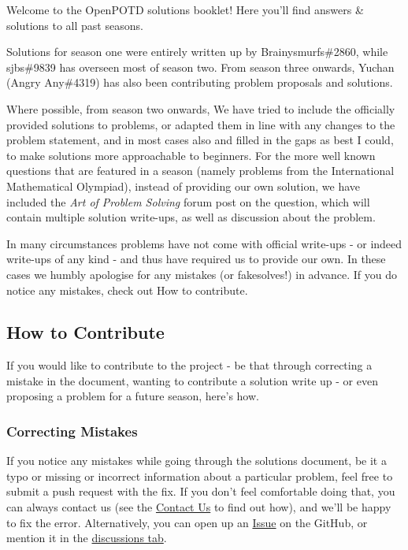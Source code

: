 Welcome to the OpenPOTD solutions booklet! Here you'll find answers \& solutions to all past seasons.\medskip

Solutions for season one were entirely written up by {\selectfont Brainysmurfs\#2860}, while {\selectfont sjbs\#9839} has overseen most of season two. 
From season three onwards, Yuchan ({\selectfont Angry Any\#4319}) has also been contributing problem proposals and solutions. 

Where possible, from season two onwards, We have tried to include the officially provided solutions to problems, 
or adapted them in line with any changes to the problem statement, and in most cases also and filled in the gaps as best I could, 
to make solutions more approachable to beginners. 
For the more well known questions that are featured in a season (namely problems from the International Mathematical Olympiad), 
instead of providing our own solution, we have included the \emph{Art of Problem Solving} forum post on the question, 
which will contain multiple solution write-ups, as well as discussion about the problem.

In many circumstances problems have not come with official write-ups - or indeed write-ups of any kind - 
and thus have required us to provide our own. In these cases we humbly apologise for any mistakes (or fakesolves!) in advance. 
If you do notice any mistakes, check out How to contribute.\medskip

\subsection*{How to Contribute}
\label{sec:contribute}

If you would like to contribute to the project - be that through correcting a mistake in the document, 
wanting to contribute a solution write up - or even proposing a problem for a future season, here's how.\medskip

\subsubsection*{Correcting Mistakes}
\label{sec:mistakes}

If you notice any mistakes while going through the solutions document, be it a typo or missing or incorrect information about a particular problem, feel free to submit a push request with the fix. 
If you don't feel comfortable doing that, you can always contact us (see the \hyperref[sec:contact]{Contact Us} to find out how), 
and we'll be happy to fix the error. Alternatively, you can open up an \href{https://github.com/OpenPOTD/Solutions/issues}{Issue} on the GitHub, or mention it in the \href{https://github.com/OpenPOTD/Solutions/discussions}{discussions tab}.\medskip

